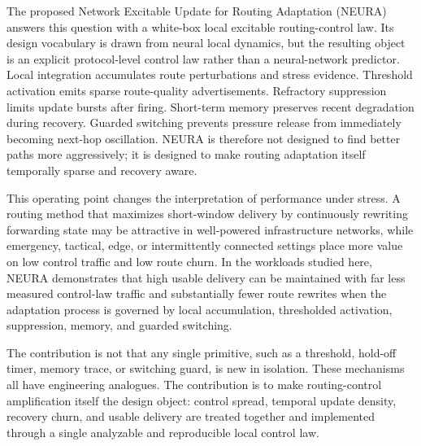 \documentclass[5p,times]{elsarticle}
\begin{document}
The proposed Network Excitable Update for Routing Adaptation (NEURA) answers this question with a white-box local excitable routing-control law. Its design vocabulary is drawn from neural local dynamics, but the resulting object is an explicit protocol-level control law rather than a neural-network predictor. Local integration accumulates route perturbations and stress evidence. Threshold activation emits sparse route-quality advertisements. Refractory suppression limits update bursts after firing. Short-term memory preserves recent degradation during recovery. Guarded switching prevents pressure release from immediately becoming next-hop oscillation. NEURA is therefore not designed to find better paths more aggressively; it is designed to make routing adaptation itself temporally sparse and recovery aware.

This operating point changes the interpretation of performance under stress. A routing method that maximizes short-window delivery by continuously rewriting forwarding state may be attractive in well-powered infrastructure networks, while emergency, tactical, edge, or intermittently connected settings place more value on low control traffic and low route churn. In the workloads studied here, NEURA demonstrates that high usable delivery can be maintained with far less measured control-law traffic and substantially fewer route rewrites when the adaptation process is governed by local accumulation, thresholded activation, suppression, memory, and guarded switching.

The contribution is not that any single primitive, such as a threshold, hold-off timer, memory trace, or switching guard, is new in isolation. These mechanisms all have engineering analogues. The contribution is to make routing-control amplification itself the design object: control spread, temporal update density, recovery churn, and usable delivery are treated together and implemented through a single analyzable and reproducible local control law.
\end{document}
